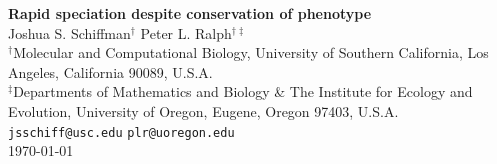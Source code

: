 \documentclass{article}
\newcommand{\1}{\mathbbm{1}}
\begin{document}

{\centering
{\LARGE \bf Rapid speciation despite conservation of phenotype} \\ \vspace{0.5cm}
Joshua S. Schiffman$^{\dagger}$ \qquad Peter L. Ralph$^{\dagger \ddagger}$ \\ \vspace{0.5cm}
$^{\dagger}${\footnotesize {Molecular and Computational Biology, University of Southern California, Los Angeles, California 90089, U.S.A. \\
$^{\ddagger}$Departments of Mathematics and Biology \& The Institute for Ecology and Evolution, University of Oregon, Eugene, Oregon 97403, U.S.A.}} \\ \vspace{0.5cm}
{\small \texttt{jsschiff@usc.edu} \qquad 
\texttt{plr@uoregon.edu}} \\ \vspace{0.5cm}
\small \today \\
\vspace{0.25cm}
}

%
%
%
%
%
%
%
%
%
%
%
%
%
%
%
\end{document}
